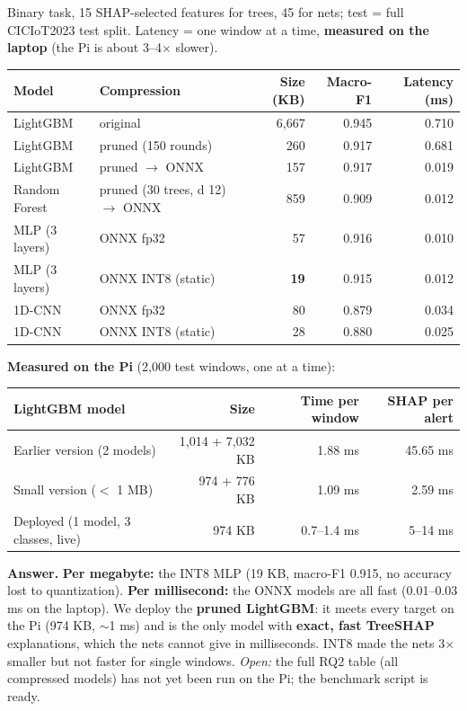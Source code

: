 \documentclass[11pt,a4paper]{article}
\newcommand{\dep}{\rowcolor{gray!18}}
\newcommand{\answer}[1]{\par\noindent\colorbox{accent!8}{\parbox{\dimexpr\linewidth-2\fboxsep}{\vspace{0.4em}\textbf{Answer.} #1\vspace{0.4em}}}\par}
\begin{document}
Binary task, 15 SHAP-selected features for trees, 45 for nets; test = full CICIoT2023 test split. Latency = one
window at a time, \textbf{measured on the laptop} (the Pi is about 3--4$\times$ slower).

\begin{center}
\begin{tabular}{llrrr}
\toprule
Model & Compression & Size (KB) & Macro-F1 & Latency (ms) \\
\midrule
LightGBM & original & 6,667 & 0.945 & 0.710 \\
LightGBM & pruned (150 rounds) & 260 & 0.917 & 0.681 \\
LightGBM & pruned $\rightarrow$ ONNX & 157 & 0.917 & 0.019 \\
Random Forest & pruned (30 trees, d 12) $\rightarrow$ ONNX & 859 & 0.909 & 0.012 \\
MLP (3 layers) & ONNX fp32 & 57 & 0.916 & 0.010 \\
MLP (3 layers) & ONNX INT8 (static) & \textbf{19} & 0.915 & 0.012 \\
1D-CNN & ONNX fp32 & 80 & 0.879 & 0.034 \\
1D-CNN & ONNX INT8 (static) & 28 & 0.880 & 0.025 \\
\bottomrule
\end{tabular}
\end{center}

\textbf{Measured on the Pi} (2,000 test windows, one at a time):

\begin{center}
\begin{tabular}{lrrr}
\toprule
LightGBM model & Size & Time per window & SHAP per alert \\
\midrule
Earlier version (2 models) & 1,014 + 7,032 KB & 1.88 ms & 45.65 ms \\
Small version ($<$ 1 MB) & 974 + 776 KB & 1.09 ms & 2.59 ms \\
\dep Deployed (1 model, 3 classes, live) & 974 KB & 0.7--1.4 ms & 5--14 ms \\
\bottomrule
\end{tabular}
\end{center}

\answer{\textbf{Per megabyte:} the INT8 MLP (19 KB, macro-F1 0.915, no accuracy lost to quantization).
\textbf{Per millisecond:} the ONNX models are all fast (0.01--0.03 ms on the laptop). We deploy the
\textbf{pruned LightGBM}: it meets every target on the Pi (974 KB, $\sim$1 ms) and is the only model with
\textbf{exact, fast TreeSHAP} explanations, which the nets cannot give in milliseconds. INT8 made the nets 3$\times$
smaller but not faster for single windows. \emph{Open:} the full RQ2 table (all compressed models) has not yet been
run on the Pi; the benchmark script is ready.}
\end{document}
